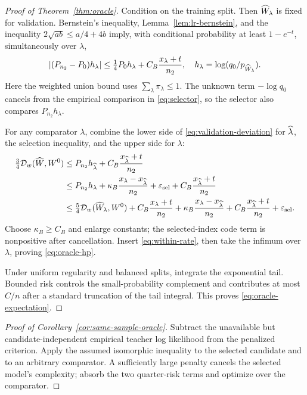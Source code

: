 \begin{proof}[Proof of Theorem~\ref{thm:oracle}]
Condition on the training split. Then \(\widehat W_\lambda\) is fixed for validation. Bernstein's inequality, Lemma~\ref{lem:lr-bernstein}, and the inequality \(2\sqrt{ab}\le a/4+4b\) imply, with conditional probability at least \(1-e^{-t}\), simultaneously over \(\lambda\),
\begin{equation}
\left|(P_{n_2}-P_0)h_\lambda\right|
\le\tfrac14P_0h_\lambda+C_B\frac{x_\lambda+t}{n_2},
\quad h_\lambda=\log(q_0/p_{\widehat W_\lambda}).
\label{eq:validation-deviation}
\end{equation}
Here the weighted union bound uses \(\sum_\lambda\pi_\lambda\le1\). The unknown term \(-\log q_0\) cancels from the empirical comparison in \cref{eq:selector}, so the selector also compares \(P_{n_2}h_\lambda\).

For any comparator \(\lambda\), combine the lower side of \cref{eq:validation-deviation} for \(\widehat\lambda\), the selection inequality, and the upper side for \(\lambda\):
\begin{align*}
\tfrac34\mathcal D_w(\widehat W,W^0)
&\le P_{n_2}h_{\widehat\lambda}
+C_B\frac{x_{\widehat\lambda}+t}{n_2}\\
&\le P_{n_2}h_\lambda
+\kappa_B\frac{x_\lambda-x_{\widehat\lambda}}{n_2}
+\varepsilon_{\mathrm{sel}}
+C_B\frac{x_{\widehat\lambda}+t}{n_2}\\
&\le\tfrac54\mathcal D_w(\widehat W_\lambda,W^0)
+C_B\frac{x_\lambda+t}{n_2}
+\kappa_B\frac{x_\lambda-x_{\widehat\lambda}}{n_2}
+C_B\frac{x_{\widehat\lambda}+t}{n_2}
+\varepsilon_{\mathrm{sel}}.
\end{align*}
Choose \(\kappa_B\ge C_B\) and enlarge constants; the selected-index code term is nonpositive after cancellation. Insert \cref{eq:within-rate}, then take the infimum over \(\lambda\), proving \cref{eq:oracle-hp}.

Under uniform regularity and balanced splits, integrate the exponential tail. Bounded risk controls the small-probability complement and contributes at most \(C/n\) after a standard truncation of the tail integral. This proves \cref{eq:oracle-expectation}.
\end{proof}

\begin{proof}[Proof of Corollary~\ref{cor:same-sample-oracle}]
Subtract the unavailable but candidate-independent empirical teacher log likelihood from the penalized criterion. Apply the assumed isomorphic inequality to the selected candidate and to an arbitrary comparator. A sufficiently large penalty cancels the selected model's complexity; absorb the two quarter-risk terms and optimize over the comparator.
\end{proof}
